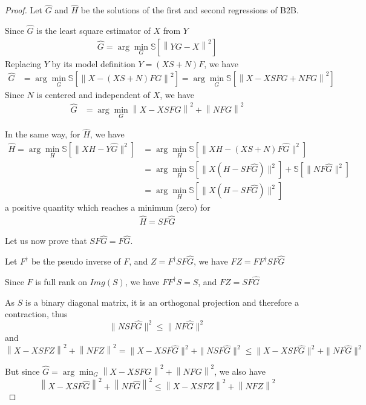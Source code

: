 \begin{proof}

 Let $\hat G$ and $\hat H$ be the solutions of the first and second regressions
 of B2B.

 Since $\hat G$ is the least square estimator of $X$ from $Y$
 \begin{align*}
    \hat G = \arg \min_G \mathbb{S}[\left \| YG - X \right \|^2]
\end{align*}
Replacing $Y$ by its model definition $Y = (XS+N)F$, we have
 \begin{align*}
    \hat G &=   \arg \min_G \mathbb{S}[\left \| X - (XS + N)FG \right\|^2] =\arg \min_G \mathbb{S}[\left \| X - XSFG + NFG \right\|^2]
  \end{align*}
  Since $N$ is centered and independent of $X$, we have
  \begin{align}
    	  \hat G &=  \arg \min_G \left \| X - XSFG\right\| ^2  + \left \| NFG\right \| ^2
     \label{eq:Gdoublenorm}
\end{align}

In the same way, for $\hat H$, we have
\begin{align*}
    \hat H = \arg \min_H \mathbb{S}[\| XH - Y \hat{G} \|^2] &=\arg  \min_H \mathbb{S}[\| XH - (XS + N)F \hat G \|^2] \\
    &=\arg \min_H \mathbb{S}[\| X(H - SF \hat G) \| ^2] + \mathbb{S}[\| NF\hat G \| ^2]\\
    &= \arg \min_H \mathbb{S}[\| X(H - SF \hat G) \| ^2]
 \end{align*}
 a positive quantity which reaches a minimum (zero) for
 \begin{align}
    \hat H = SF \hat G
    \label{eq:Hdoublenom}
\end{align}

Let us now prove that $SF\hat G = F\hat G$.

Let $F^\dagger$ be the pseudo inverse of $F$, and $Z=F^\dagger SF\hat G$, we
have $FZ = FF^\dagger SF \hat G$

Since $F$ is full rank on $Img(S)$, we have $FF^\dagger S =S$, and $FZ = SF\hat
G$

As $S$ is a binary diagonal matrix, it is an orthogonal projection and therefore
a contraction, thus
 $$ \| NSF\hat G\|^2 \leq \| NF\hat G \|^2$$ and
 $$\left \| X - XSFZ\right \| ^2  + \left \| NFZ\right \| ^2 = \| X - XSF\hat G \| ^2  + \| NSF\hat G \| ^2 \leq \| X - XSF\hat G \| ^2  + \| NF\hat G \| ^2$$

But since $\hat G =  \arg \min_G \left \| X - XSFG\right\| ^2  + \left \| NFG\right \| ^2$, we also have
$$\left \| X - XSF\hat G\right\| ^2  + \left \| NF\hat G\right \| ^2 \leq \left \| X - XSFZ\right \| ^2  + \left \| NFZ\right \| ^2$$


\end{proof}
